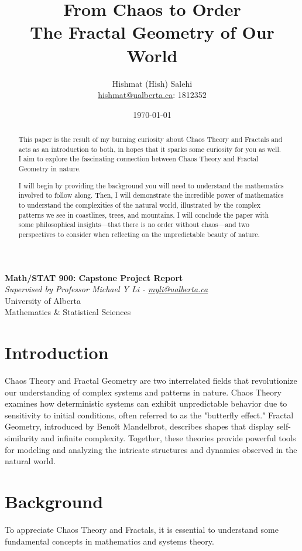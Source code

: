 \documentclass[12pt]{article}
\title{From Chaos to Order\\
       \large The Fractal Geometry of Our World}
\author{Hishmat (Hish) Salehi \\
\href{mailto:hishmat@ualberta.ca}{hishmat@ualberta.ca}: 1812352}
\date{\today}
\begin{document}
\maketitle

\begin{center}
\textbf{Math/STAT 900: Capstone Project Report}  \\
\emph{Supervised by Professor Michael Y Li - 
\href{mailto:myli@ualberta.ca}{myli@ualberta.ca}}  \\
University of Alberta \\
Mathematics \& Statistical Sciences
\end{center}

\begin{abstract}
This paper is the result of my burning curiosity about Chaos Theory and Fractals and acts as an introduction to both, in hopes that it sparks some curiosity for you as well. I aim to explore the fascinating connection between Chaos Theory and Fractal Geometry in nature. 

I will begin by providing the background you will need to understand the mathematics involved to follow along. Then, I will demonstrate the incredible power of mathematics to understand the complexities of the natural world, illustrated by the complex patterns we see in coastlines, trees, and mountains. I will conclude the paper with some philosophical insights—that there is no order without chaos—and two perspectives to consider when reflecting on the unpredictable beauty of nature.
\end{abstract}

\newpage

\tableofcontents

\section{Introduction}
Chaos Theory and Fractal Geometry are two interrelated fields that revolutionize our understanding of complex systems and patterns in nature. Chaos Theory examines how deterministic systems can exhibit unpredictable behavior due to sensitivity to initial conditions, often referred to as the "butterfly effect." Fractal Geometry, introduced by Benoît Mandelbrot, describes shapes that display self-similarity and infinite complexity. Together, these theories provide powerful tools for modeling and analyzing the intricate structures and dynamics observed in the natural world.

\section{Background}
To appreciate Chaos Theory and Fractals, it is essential to understand some fundamental concepts in mathematics and systems theory.
\end{document}
